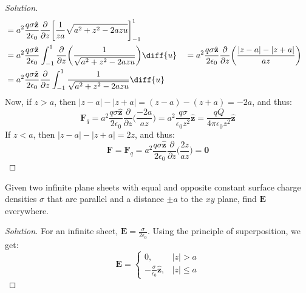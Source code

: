 \documentclass[crop=false,class=book,oneside]{standalone}
\begin{document}
\begin{proof}[Solution]
\begin{align*}
                    &=a^{2}\frac{q\sigma \hat{\mathbf{z}}}{2\epsilon_{0}}
                    \frac{\partial}{\partial z}
                    \bigg[\frac{1}{za}\sqrt{a^{2}+z^{2}-2azu}\bigg]_{-1}^{1}\\
                    &=a^{2}\frac{q\sigma\hat{\mathbf{z}}}{2\epsilon_{0}}
                    \int_{-1}^{1}\frac{\partial}{\partial{z}}
                    \bigg(\frac{1}{\sqrt{a^{2}+z^{2}-2azu}}\bigg)\diff{u}
                    &
                    &=a^{2}\frac{q\sigma\hat{\mathbf{z}}}{2\epsilon_{0}}
                    \frac{\partial}{\partial{z}}
                    \bigg(\frac{|z-a|-|z+a|}{az}\bigg)\\
                    &=a^{2}\frac{q\sigma \hat{\mathbf{z}}}{2\epsilon_{0}}
                    \frac{\partial}{\partial{z}}
                    \int_{-1}^{1}\frac{1}{\sqrt{a^{2}+z^{2}-2azu}}\diff{u}\\
                \end{align*}
                Now, if $z>a$, then $|z-a|-|z+a|=(z-a)-(z+a)=-2a$, and thus:
                \begin{equation*}
                    \mathbf{F}_{q}
                    =a^{2}\frac{q\sigma\hat{\mathbf{z}}}{2\epsilon_{0}}
                    \frac{\partial}{\partial{z}}\bigg(\frac{-2a}{az}\bigg)
                    =a^{2}\frac{q\sigma}{\epsilon_{0}z^{2}}\hat{\mathbf{z}}
                    =\frac{qQ}{4\pi\epsilon_{0}z^{2}}\hat{\mathbf{z}}\tag{$z>a$}
                \end{equation*}
                If $z<a$, then $|z-a|-|z+a|=2z$, and thus:
                \begin{equation*}
                    \mathbf{F}=\mathbf{F}_{q}=a^{2}\frac{q\sigma
                    \hat{\mathbf{z}}}{2\epsilon_{0}}
                    \frac{\partial}{\partial z}\bigg(\frac{2z}{az}\bigg)
                    =\mathbf{0}\tag{$z<a$}
                \end{equation*}
            \end{proof}
            \begin{problem}[Wangsness 3-9]
                Given two infinite plane sheets with equal and opposite
                constant surface charge densities $\sigma$ that are
                parallel and a distance $\pm a$ to the $xy$ plane,
                find $\mathbf{E}$ everywhere.
            \end{problem}
            \begin{proof}[Solution]
                For an infinite sheet,
                $\mathbf{E}=\frac{\sigma}{2\epsilon_{0}}$.
                Using the principle of superposition, we get:
                \begin{equation*}
                    \mathbf{E}=
                    \begin{cases}
                        0,
                        &|z|>a\\
                        -\frac{\sigma}
                              {\epsilon_{0}}\hat{\mathbf{z}},
                        &|z|\leq{a}
                    \end{cases}
                \end{equation*}
            \end{proof}
\end{document}
